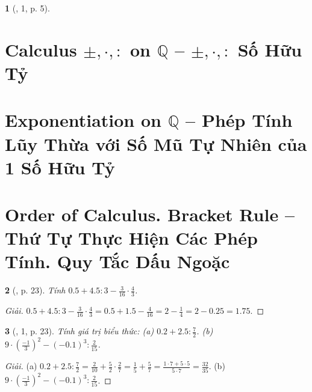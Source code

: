 \documentclass{article}
\newtheorem{baitoan}{}
\begin{document}
\begin{baitoan}[\cite{SGK_Toan_7_Canh_Dieu_tap_1}, 1, p. 5]
	
\end{baitoan}


\section{Calculus $\pm,\cdot,:$ on $\mathbb{Q}$ -- $\pm,\cdot,:$ Số Hữu Tỷ}


\section{Exponentiation on $\mathbb{Q}$ -- Phép Tính Lũy Thừa với Số Mũ Tự Nhiên của 1 Số Hữu Tỷ}


\section{Order of Calculus. Bracket Rule -- Thứ Tự Thực Hiện Các Phép Tính. Quy Tắc Dấu Ngoặc}

\begin{baitoan}[\cite{SGK_Toan_7_Canh_Dieu_tap_1}, p. 23]
	Tính $0.5 + 4.5:3 - \frac{3}{16}\cdot\frac{4}{3}$.
\end{baitoan}

\begin{proof}[Giải]
	$0.5 + 4.5:3 - \frac{3}{16}\cdot\frac{4}{3} = 0.5 + 1.5 - \frac{4}{16} = 2 - \frac{1}{4} = 2 - 0.25 = 1.75$.
\end{proof}

\begin{baitoan}[\cite{SGK_Toan_7_Canh_Dieu_tap_1}, 1, p. 23]
	Tính giá trị biểu thức: (a) $0.2 + 2.5:\frac{7}{2}$. (b) $9\cdot\left(\frac{-1}{3}\right)^2 - (-0.1)^3:\frac{2}{15}$.
\end{baitoan}

\begin{proof}[Giải]
	(a) $0.2 + 2.5:\frac{7}{2} = \frac{2}{10} + \frac{5}{2}\cdot\frac{2}{7} = \frac{1}{5} + \frac{5}{7} = \frac{1\cdot7 + 5\cdot5}{5\cdot7} = \frac{32}{35}$. (b) $9\cdot\left(\frac{-1}{3}\right)^2 - (-0.1)^3:\frac{2}{15}$.
\end{proof}
\end{document}
